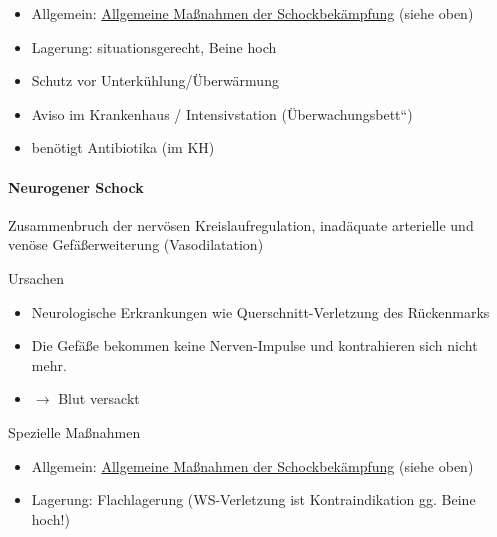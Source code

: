 \documentclass{article}
\newcommand\gZ[1]{\textcolor[rgb]{0.5019608,0.5019608,0.5019608}{#1}}
\begin{document}
\begin{itemize}
\item {\mdseries\color[rgb]{0.0,0.0,0.5019608}
Allgemein:
\hyperlink{a761AllgemeineManahmenderSchockbekmpfungoutline}{Allgemeine
Ma{\ss}nahmen der Schockbek\"ampfung} (siehe oben) }

\item {\mdseries\color[rgb]{0.0,0.0,0.5019608}
Lagerung: situationsgerecht, Beine hoch}

\item {\mdseries\color[rgb]{0.0,0.0,0.5019608}
Schutz vor Unterk\"uhlung/\"Uberw\"armung}

\item {\mdseries\color[rgb]{0.0,0.0,0.5019608}
Aviso im Krankenhaus / Intensivstation
({\quotedblbase}\"Uberwachungsbett{\textquotedblleft})}

\item {\mdseries\color[rgb]{0.0,0.0,0.5019608}
\gZ{ben\"otigt Antibiotika (im KH)}}

\end{itemize}
\paragraph{Neurogener Schock}
{\mdseries
Zusammenbruch der nerv\"osen Kreislaufregulation, inad\"aquate
arterielle und ven\"ose Gef\"a{\ss}erweiterung (Vasodilatation)}

{\mdseries\color{black}
Ursachen }

\begin{itemize}
\item {\mdseries
Neurologische Erkrankungen wie Querschnitt-Verletzung des R\"uckenmarks}

\item {\mdseries
Die Gef\"a{\ss}e bekommen keine Nerven-Impulse und kontrahieren sich
nicht mehr.}

\item {\mdseries
${\rightarrow}$ Blut versackt}

\end{itemize}
{\mdseries\color{black}
Spezielle Ma{\ss}nahmen}

\begin{itemize}
\item {\mdseries\color[rgb]{0.0,0.0,0.5019608}
Allgemein:
\hyperlink{a761AllgemeineManahmenderSchockbekmpfungoutline}{Allgemeine
Ma{\ss}nahmen der Schockbek\"ampfung} (siehe oben) }

\item {\mdseries\color[rgb]{0.0,0.0,0.5019608}
Lagerung: Flachlagerung (WS-Verletzung ist Kontraindikation gg. Beine
hoch!)}

\end{itemize}
\end{document}

